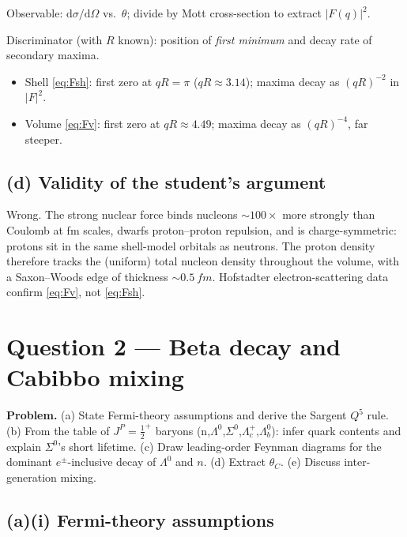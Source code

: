 \documentclass[11pt]{article}
\newcommand{\de}{\mathrm{d}}
\begin{document}
Observable: $\de\sigma/\de\Omega$ vs.\ $\theta$; divide by Mott cross-section to extract $|F(q)|^{2}$.

Discriminator (with $R$ known): position of \emph{first minimum} and decay rate of secondary maxima.
\begin{itemize}
\item Shell \eqref{eq:Fsh}: first zero at $qR=\pi$ ($qR\approx 3.14$); maxima decay as $(qR)^{-2}$ in $|F|^{2}$.
\item Volume \eqref{eq:Fv}: first zero at $qR\approx 4.49$; maxima decay as $(qR)^{-4}$, far steeper.
\end{itemize}

\subsection*{(d) Validity of the student's argument}

Wrong. The strong nuclear force binds nucleons $\sim 100\times$ more strongly than Coulomb at \si{fm} scales, dwarfs proton--proton repulsion, and is charge-symmetric: protons sit in the same shell-model orbitals as neutrons. The proton density therefore tracks the (uniform) total nucleon density throughout the volume, with a Saxon--Woods edge of thickness $\sim\SI{0.5}{fm}$. Hofstadter electron-scattering data confirm \eqref{eq:Fv}, not \eqref{eq:Fsh}.

\section*{Question 2 --- Beta decay and Cabibbo mixing}

\textbf{Problem.} (a) State Fermi-theory assumptions and derive the Sargent $Q^{5}$ rule. (b) From the table of $J^{P}=\tfrac12^{+}$ baryons (n,$\Lambda^{0}$,$\Sigma^{0}$,$\Lambda_c^{+}$,$\Lambda_b^{0}$): infer quark contents and explain $\Sigma^{0}$'s short lifetime. (c) Draw leading-order Feynman diagrams for the dominant $e^{\pm}$-inclusive decay of $\Lambda^{0}$ and $n$. (d) Extract $\theta_{C}$. (e) Discuss inter-generation mixing.

\subsection*{(a)(i) Fermi-theory assumptions}
\end{document}
